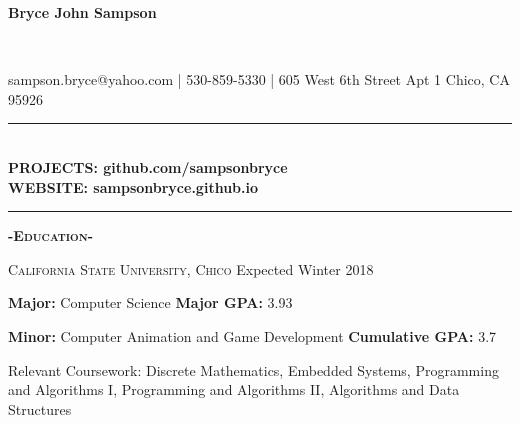 \documentclass[12pt]{article}
\begin{document}
\center
\begin{Huge}\textbf{Bryce John Sampson}\end{Huge}\\
\medskip
\fontsize{12}{1.2}
\selectfont

\noindent
sampson.bryce@yahoo.com | 530-859-5330 | 605 West 6th Street Apt 1 Chico, CA 95926
\noindent\rule{17cm}{0.4pt}\\
\smallskip
\textbf{PROJECTS: \color{TealBlue}github.com/sampsonbryce}\\
\smallskip
\textbf{WEBSITE: \color{TealBlue}sampsonbryce.github.io}\\
\smallskip
\noindent\rule{17cm}{0.4pt}

\center
\textbf{\textsc{-Education-}}\\
\flushleft
\begin{footnotesize}
\textsc{California State University, Chico}
\hfill
\color{gray}Expected Winter 2018\\
\color{black}
\smallskip

\color{Cerulean}\textbf{Major: }\color{black}Computer Science
\hfill
\color{Cerulean}\textbf{Major GPA: }\color{black}3.93\\
\smallskip

\color{Cerulean}\textbf{Minor: }\color{black}Computer Animation and Game Development
\hfill
\color{Cerulean}\textbf{Cumulative GPA: }\color{black}3.7\\
\smallskip

\color{Cerulean}Relevant Coursework: \color{black} Discrete Mathematics, Embedded Systems,
Programming and Algorithms I, Programming and Algorithms II, Algorithms and Data Structures
\end{footnotesize}

\smallskip
\end{document}
